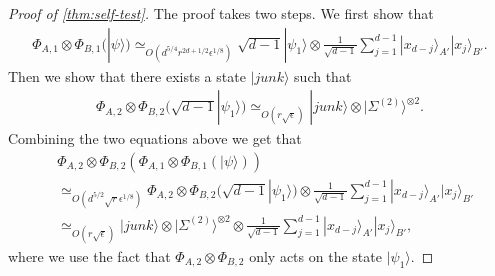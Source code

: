 \documentclass[11pt,letterpaper]{article}
\newcommand{\ket}[1]{|#1\rangle}
\newcommand{\x}{\otimes}
\newcommand{\1}{\mathbb{1}}
\newcommand{\EPR}[1]{\Sigma^{(#1)}}
\newcommand{\ep}{\epsilon}
\newcommand{\se}{\sqrt{\epsilon}}
\newcommand{\sr}{\sqrt{r}}
\newcommand{\appd}[1]{\simeq_{#1}}
\theoremstyle{definition}
\begin{document}
\begin{proof}[Proof of \cref{thm:self-test}]
The proof takes two steps. 
We first show that 
\begin{align}
	\Phi_{A,1}\x\Phi_{B,1}(\ket{\psi}) \appd{O(d^{5/4} r^{2d+1/2} \ep^{1/8})} \sqrt{d-1}\ket{\psi_1} \x \frac{1}{\sqrt{d-1}}\sum_{j=1}^{d-1} \ket{x_{d-j}}_{A'}\ket{x_j}_{B'}.
\end{align}
Then we show that there exists a state $\ket{junk}$ such that  
\begin{align}
\label{eq:phi2_result}
\Phi_{A,2} \x \Phi_{B,2} (\sqrt{d-1}\ket{\psi_1}) \appd{O(r\se)} \ket{junk} \x \ket{\EPR{2}}^{\x 2}.
\end{align}
Combining the two equations above we get that 
\begin{align*}
	&\Phi_{A,2} \x \Phi_{B,2}( \Phi_{A,1} \x \Phi_{B,1} (\ket{\psi})) \\
	&\appd{O(d^{5/2} \sr \ep^{1/8})} \Phi_{A,2} \x \Phi_{B,2}(\sqrt{d-1} \ket{\psi_1}) \x\frac{1}{\sqrt{d-1}}\sum_{j=1}^{d-1} \ket{x_{d-j}}_{A'}\ket{x_j}_{B'} \\
	&\appd{O(r\se)} \ket{junk} \x \ket{\EPR{2}}^{\x 2} \x\frac{1}{\sqrt{d-1}}\sum_{j=1}^{d-1} \ket{x_{d-j}}_{A'}\ket{x_j}_{B'},
\end{align*}
where we use the fact that $\Phi_{A,2}\x \Phi_{B,2}$ only acts on the state $\ket{\psi_1}$.


\end{proof}
\end{document}
